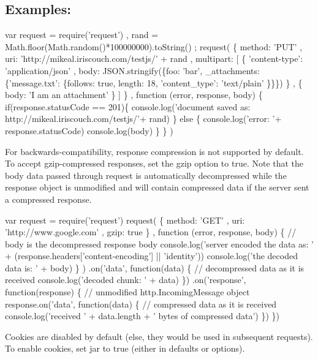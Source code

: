 \subsection*{Examples\+:}


\begin{DoxyCode}
var request = require('request')
  , rand = Math.floor(Math.random()*100000000).toString()
  ;
request(
  \{ method: 'PUT'
  , uri: 'http://mikeal.iriscouch.com/testjs/' + rand
  , multipart:
    [ \{ 'content-type': 'application/json'
      ,  body: JSON.stringify(\{foo: 'bar', \_attachments: \{'message.txt': \{follows: true, length: 18,
       'content\_type': 'text/plain' \}\}\})
      \}
    , \{ body: 'I am an attachment' \}
    ]
  \}
, function (error, response, body) \{
    if(response.statusCode == 201)\{
      console.log('document saved as: http://mikeal.iriscouch.com/testjs/'+ rand)
    \} else \{
      console.log('error: '+ response.statusCode)
      console.log(body)
    \}
  \}
)
\end{DoxyCode}


For backwards-\/compatibility, response compression is not supported by default. To accept gzip-\/compressed responses, set the {\ttfamily gzip} option to {\ttfamily true}. Note that the body data passed through {\ttfamily request} is automatically decompressed while the response object is unmodified and will contain compressed data if the server sent a compressed response.


\begin{DoxyCode}
var request = require('request')
request(
  \{ method: 'GET'
  , uri: 'http://www.google.com'
  , gzip: true
  \}
, function (error, response, body) \{
    // body is the decompressed response body
    console.log('server encoded the data as: ' + (response.headers['content-encoding'] || 'identity'))
    console.log('the decoded data is: ' + body)
  \}
)
.on('data', function(data) \{
  // decompressed data as it is received
  console.log('decoded chunk: ' + data)
\})
.on('response', function(response) \{
  // unmodified http.IncomingMessage object
  response.on('data', function(data) \{
    // compressed data as it is received
    console.log('received ' + data.length + ' bytes of compressed data')
  \})
\})
\end{DoxyCode}


Cookies are disabled by default (else, they would be used in subsequent requests). To enable cookies, set {\ttfamily jar} to {\ttfamily true} (either in {\ttfamily defaults} or {\ttfamily options}).


